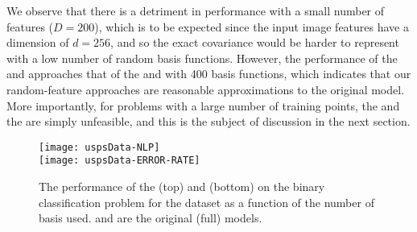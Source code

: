 We observe that there is a detriment in performance with a small 
number of features ($D=200$),  which is to be expected since the input image 
features have a dimension of $d = 256$, and so
the exact covariance would be harder to represent with a low number of random
basis functions. 
However, the performance of the
\eks and \uks approaches that of the \ugp and \egp with 400 basis functions,
which indicates that our random-feature approaches are reasonable approximations to
the original \gp model. More importantly, for problems with a large number of training 
points, the \egp and the \ugp are simply unfeasible, and this is the subject of discussion 
in the next section.
\begin{figure}[t]
\centering
\texttt{[image: uspsData-NLP]}  \\
\texttt{[image: uspsData-ERROR-RATE]}  
\caption{The performance of the \eks (top) and \uks (bottom) on the binary classification problem for the \usps dataset as a function of 
the number of  basis used. \egp and \ugp are the original (full) \gp models.
\label{fig:usps}
}
\end{figure}
%
 



 
